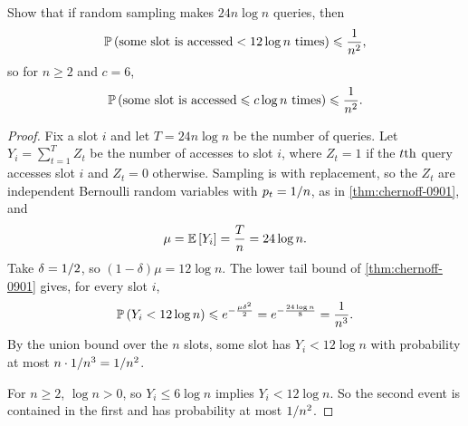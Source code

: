 \begin{exercisebox}
\begin{exercise}\label{ex:maxload-0901}\label{lem:maxload-lower-0901}
    Show that if random sampling makes $24 n \log n$ queries, then
    \[\prob{\text{some slot is accessed} < 12 \log n \text{ times}} \leq \frac{1}{n^2},\]
    so for $n \geq 2$ and $c = 6$,
    \[\prob{\text{some slot is accessed} \leq c \log n \text{ times}} \leq \frac{1}{n^2}.\]
\end{exercise}
\tcblower
\begin{proof}
%
    Fix a slot $i$ and let $T = 24 n \log n$ be the number of queries. Let
    $Y_i = \sum_{t=1}^{T} Z_t$ be the number of accesses to slot $i$, where $Z_t = 1$ if the
    $t\text{th}$ query accesses slot $i$ and $Z_t = 0$ otherwise. Sampling is with replacement, so the
    $Z_t$ are independent Bernoulli random variables with $p_t = 1/n$, as in
    \cref{thm:chernoff-0901}, and
    \[\mu = \expectation{Y_i} = \frac{T}{n} = 24 \log n.\]
    Take $\delta = 1/2$, so $(1 - \delta)\mu = 12 \log n$. The lower tail bound of
    \cref{thm:chernoff-0901} gives, for every slot $i$,
    \[\prob{Y_i < 12 \log n} \leq e^{-\frac{\mu \delta^2}{2}}
        = e^{-\frac{24 \log n}{8}} = \frac{1}{n^3}.\]
    By the union bound over the $n$ slots, some slot has $Y_i < 12 \log n$ with probability at
    most $n \cdot 1/n^3 = 1/n^2$.

    For $n \geq 2$, $\log n > 0$, so $Y_i \leq 6 \log n$ implies $Y_i < 12 \log n$. So the second
    event is contained in the first and has probability at most $1/n^2$.
\end{proof}
\end{exercisebox}

